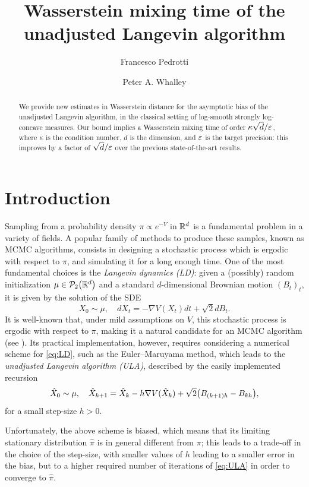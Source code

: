 \documentclass[11pt,a4paper]{article}
\title{Wasserstein mixing time of the unadjusted Langevin algorithm}
\author{Francesco Pedrotti}
\author{Peter A. Whalley}
\affil{ETH Z\"urich}
\begin{document}
\maketitle

\begin{abstract}
    We provide new estimates in Wasserstein distance for the asymptotic bias of the unadjusted Langevin algorithm, in the classical setting of log-smooth strongly log-concave measures. Our bound implies a Wasserstein mixing time of order $\kappa \sqrt{d}/\varepsilon$, where $\kappa$ is the condition number, $d$ is the dimension, and $\varepsilon$ is the target precision: this improves by a factor of $\sqrt{d}/\varepsilon$ over the previous state-of-the-art results. 
\end{abstract}

\section{Introduction}

Sampling from a probability density $\pi \propto e^{-V}$ in $\mathbb{R}^d$ is a fundamental problem in a variety of fields.
	A popular family of methods to produce these samples, known as MCMC algorithms, consists in designing a stochastic process which is ergodic with respect to $\pi$, and simulating it for a long enough time.
	One  of the most fundamental choices is the \emph{Langevin dynamics (LD)}: given a (possibly) random initialization $\mu \in \pp_{2}\tond*{\R^d}$ and a standard $d$-dimensional Brownian motion $(B_t)_t$, it is  given by the solution of the SDE
	\begin{equation}
		\label{eq:LD}
		X_0\sim \mu, \quad dX_t = -\nabla V(X_t) dt + \sqrt{2}dB_t.
	\end{equation}
	It is well-known that, under mild assumptions on $V$, this stochastic process is ergodic with respect to $\pi$, making it a natural candidate for an MCMC algorithm (see \cite{PavBook}). Its practical implementation, however, requires considering a numerical scheme for \eqref{eq:LD}, such as the Euler--Maruyama method, which leads to the \emph{unadjusted Langevin algorithm (ULA)}, described by the easily implemented recursion 
	\begin{equation}
		\label{eq:ULA}
		\hatx_0 \sim \mu, \quad \hatx_{k+1} = \hatx_k - h\nabla V(\hatx_k) + \sqrt{2}\tond*{B_{(k+1)h} -B_{kh}},
	\end{equation}
	for a small step-size $h>0$. 
	
	Unfortunately, the above scheme is biased, which means that its limiting stationary distribution $\hat \pi$ is in general different from $\pi$; this leads to a trade-off in the choice of the step-size, with smaller values of $h$ leading to a smaller error in the bias, but to a higher required number of iterations of \eqref{eq:ULA} in order to converge to $\hat\pi$.
\end{document}
